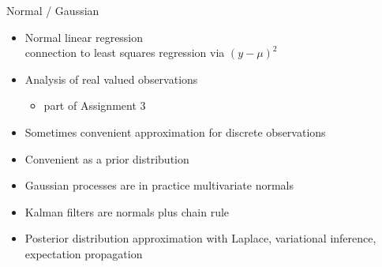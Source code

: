 \documentclass[finnish,english,t]{beamer}
\begin{document}
\begin{frame}{Normal / Gaussian}

  \begin{itemize}
  \item<+-> Normal linear regression\\
    {\color{gray}connection to least squares regression via $(y-\mu)^2$}
  \item<+-> Analysis of real valued observations
    \begin{itemize}
    \item part of Assignment 3
    \end{itemize}
  \item<+-> Sometimes convenient approximation for discrete observations
  \item<+-> Convenient as a prior distribution
  \item<+-> Gaussian processes are in practice multivariate normals
  \item<+-> Kalman filters are normals plus chain rule
  \item<+-> Posterior distribution approximation with Laplace, variational
    inference, expectation propagation
  \end{itemize}
  
\end{frame}
\end{document}
